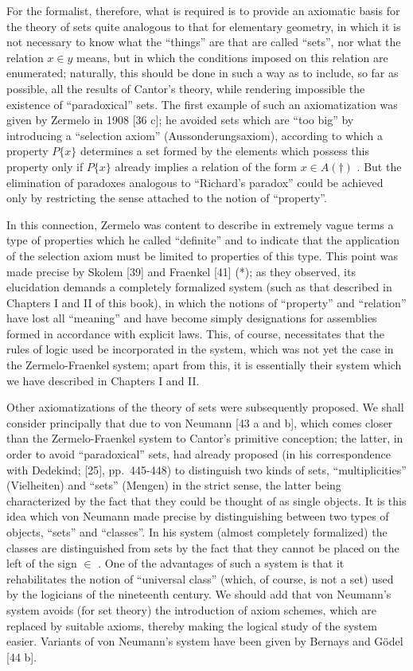 For the formalist, therefore, what is required is to provide an axiomatic basis for the theory of sets quite analogous to that for elementary geometry, in which it is not necessary to know what the ``things'' are that are called ``sets'', nor what the relation \(x \in y\) means, but in which the conditions imposed on this relation are enumerated; naturally, this should be done in such a way as to include, so far as possible, all the results of Cantor's theory, while rendering impossible the existence of ``paradoxical'' sets. The first example of such an axiomatization was given by Zermelo in 1908 {[}36 c{]}; he avoided sets which are ``too big'' by introducing a ``selection axiom'' (Aussonderungsaxiom), according to which a property \(P\{x\}\) determines a set formed by the elements which possess this property only if \(P\{x\}\) already implies a relation of the form \(x \in A (\dagger)\) . But the elimination of paradoxes analogous to ``Richard's paradox'' could be achieved only by restricting the sense attached to the notion of ``property''.

In this connection, Zermelo was content to describe in extremely vague terms a type of properties which he called ``definite'' and to indicate that the application of the selection axiom must be limited to properties of this type. This point was made precise by Skolem {[}39{]} and Fraenkel {[}41{]} (*); as they observed, its elucidation demands a completely formalized system (such as that described in Chapters I and II of this book), in which the notions of ``property'' and ``relation'' have lost all ``meaning'' and have become simply designations for assemblies formed in accordance with explicit laws. This, of course, necessitates that the rules of logic used be incorporated in the system, which was not yet the case in the Zermelo-Fraenkel system; apart from this, it is essentially their system which we have described in Chapters I and II.

Other axiomatizations of the theory of sets were subsequently proposed. We shall consider principally that due to von Neumann {[}43 a and b{]}, which comes closer than the Zermelo-Fraenkel system to Cantor's primitive conception; the latter, in order to avoid ``paradoxical'' sets, had already proposed (in his correspondence with Dedekind; {[}25{]}, pp.~445-448) to distinguish two kinds of sets, ``multiplicities'' (Vielheiten) and ``sets'' (Mengen) in the strict sense, the latter being characterized by the fact that they could be thought of as single objects. It is this idea which von Neumann made precise by distinguishing between two types of objects, ``sets'' and ``classes''. In his system (almost completely formalized) the classes are distinguished from sets by the fact that they cannot be placed on the left of the sign \(\in\) . One of the advantages of such a system is that it rehabilitates the notion of ``universal class'' (which, of course, is not a set) used by the logicians of the nineteenth century. We should add that von Neumann's system avoids (for set theory) the introduction of axiom schemes, which are replaced by suitable axioms, thereby making the logical study of the system easier. Variants of von Neumann's system have been given by Bernays and Gödel {[}44 b{]}.

